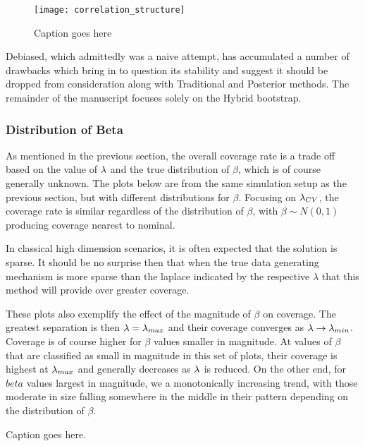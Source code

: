 \begin{figure}[hbtp]
  \texttt{[image: correlation\_structure]}
  \caption{\label{Fig:correlation_structure} Caption goes here}
\end{figure}

Debiased, which admittedly was a naive attempt, has accumulated a number of drawbacks which bring in to question its stability and suggest it should be dropped from consideration along with Traditional and Posterior methods. The remainder of the manuscript focuses solely on the Hybrid bootstrap.


\subsubsection{Distribution of Beta}

As mentioned in the previous section, the overall coverage rate is a trade off based on the value of $\lambda$ and the true distribution of $\beta$, which is of course generally unknown. The plots below are from the same simulation setup as the previous section, but with different distributions for $\beta$. Focusing on $\lambda_{CV}$, the coverage rate is similar regardless of the distribution of $\beta$, with $\beta \sim N(0, 1)$ producing coverage nearest to nominal.

In classical high dimension scenarios, it is often expected that the solution is sparse. It should be no surprise then that when the true data generating mechanism is more sparse than the laplace indicated by the respective $\lambda$ that this method will provide over greater coverage.

These plots also exemplify the effect of the magnitude of $\beta$ on coverage. The greatest separation is then $\lambda = \lambda_{max}$ and their coverage converges as $\lambda \rightarrow \lambda_{min}$. Coverage is of course higher for $\beta$ values smaller in magnitude. At values of $\beta$ that are classified as small in magnitude in this set of plots, their coverage is highest at $\lambda_{max}$ and generally decreases as $\lambda$ is reduced. On the other end, for $beta$ values largest in magnitude, we a monotonically increasing trend, with those moderate in size falling somewhere in the middle in their pattern depending on the distribution of $\beta$.

\begin{table}[hbtp]
  \centering
  
  \caption{\label{Fig:dist_beta} Caption goes here.}
\end{table}

